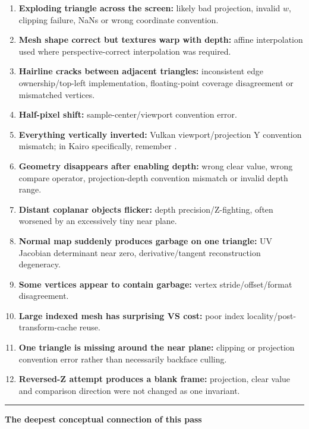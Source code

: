\begin{enumerate}
\def\labelenumi{\arabic{enumi}.}
\tightlist
\item
  \textbf{Exploding triangle across the screen:} likely bad projection, invalid \(w\), clipping failure, NaNs or wrong coordinate convention.
\item
  \textbf{Mesh shape correct but textures warp with depth:} affine interpolation used where perspective-correct interpolation was required.
\item
  \textbf{Hairline cracks between adjacent triangles:} inconsistent edge ownership/top-left implementation, floating-point coverage disagreement or mismatched vertices.
\item
  \textbf{Half-pixel shift:} sample-center/viewport convention error.
\item
  \textbf{Everything vertically inverted:} Vulkan viewport/projection Y convention mismatch; in Kairo specifically, remember .
\item
  \textbf{Geometry disappears after enabling depth:} wrong clear value, wrong compare operator, projection-depth convention mismatch or invalid depth range.
\item
  \textbf{Distant coplanar objects flicker:} depth precision/Z-fighting, often worsened by an excessively tiny near plane.
\item
  \textbf{Normal map suddenly produces garbage on one triangle:} UV Jacobian determinant near zero, derivative/tangent reconstruction degeneracy.
\item
  \textbf{Some vertices appear to contain garbage:} vertex stride/offset/format disagreement.
\item
  \textbf{Large indexed mesh has surprising VS cost:} poor index locality/post-transform-cache reuse.
\item
  \textbf{One triangle is missing around the near plane:} clipping or projection convention error rather than necessarily backface culling.
\item
  \textbf{Reversed-Z attempt produces a blank frame:} projection, clear value and comparison direction were not changed as one invariant.
\end{enumerate}

\begin{center}\rule{0.5\linewidth}{0.5pt}\end{center}

\textbf{The deepest conceptual connection of this pass}


